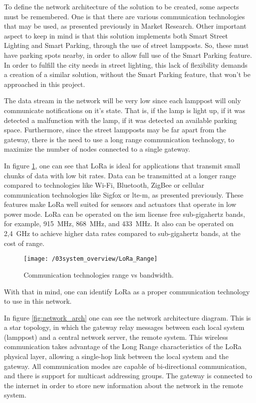 To define the network architecture of the solution to be created, some aspects must be remembered. One is that there are various communication technologies that may be used, as presented previously in Market Research. Other important aspect to keep in mind is that this solution implements both Smart Street Lighting and Smart Parking, through the use of street lampposts. So, these must have parking spots nearby, in order to allow full use of the Smart Parking feature. In order to fulfill the city needs in street lighting, this lack of flexibility demands a creation of a similar solution, without the Smart Parking feature, that won't be approached in this project.

The data stream in the network will be very low since each lamppost will only communicate notifications on it's state. That is, if the lamp is light up, if it was detected a malfunction with the lamp, if it was detected an available parking space. Furthermore, since the street lampposts may be far apart from the gateway, there is the need to use a long range communication technology, to maximize the number of nodes connected to a single gateway.

In figure \ref{fig:LoRa_Range}, one can see that LoRa is ideal for applications that transmit small chunks of data with low bit rates. Data can be transmitted at a longer range compared to technologies like Wi-Fi, Bluetooth, ZigBee or cellular communication technologies like Sigfox or \ac{lte-m}, as presented previously. These features make LoRa well suited for sensors and actuators that operate in low power mode. LoRa can be operated on the \ac{ism} license free sub-gigahertz bands, for example, 915~MHz, 868~MHz, and 433~MHz. It also can be operated on 2,4~GHz to achieve higher data rates compared to sub-gigahertz bands, at the cost of range. \cite{lora_lorawan}

\begin{figure}[ht]
	\centering
	\texttt{[image: /03system\_overview/LoRa\_Range]}
	\caption{Communication technologies range vs bandwidth.}
	\label{fig:LoRa_Range}
\end{figure}

\clearpage
With that in mind, one can identify LoRa as a proper communication technology to use in this network. 

In figure \ref{fig:network_arch} one can see the network architecture diagram. This is a star topology, in which the gateway relay messages between each local system (lamppost) and a central network server, the remote system. This wireless communication takes advantage of the Long Range characteristics of the LoRa physical layer, allowing a single-hop link between the local system and the gateway. All communication modes are capable of bi-directional communication, and there is support for multicast addressing groups. The gateway is connected to the internet in order to store new information about the network in the remote system.

